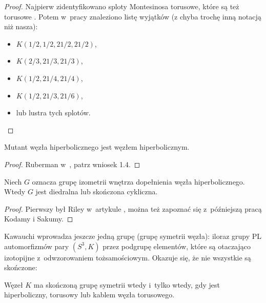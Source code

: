 \begin{proof}
    Najpierw zidentyfikowano sploty Montesinosa torusowe, które są też torusowe \cite{boileau80}.
    Potem w~pracy \cite{oertel84} znaleziono listę wyjątków (z chyba trochę inną notacją niż nasza):
    \begin{itemize}
        \item $K(1/2, 1/2, 21/2, 21/2)$,
        \item $K(2/3, 21/3, 21/3)$,
        \item $K(1/2, 21/4, 21/4)$,
        \item $K(1/2, 21/3, 21/6)$,
        \item lub lustra tych splotów. \qedhere
    \end{itemize}
\end{proof}

\begin{proposition}
    Mutant węzła hiperbolicznego jest węzłem hiperbolicznym.
\end{proposition}

\begin{proof}
%
    Ruberman w~\cite{ruberman87}, patrz wniosek 1.4.
\end{proof}

\begin{proposition}
    Niech $G$ oznacza grupę izometrii wnętrza dopełnienia węzła hiperbolicznego.
    Wtedy $G$ jest diedralna lub skończona cykliczna.
\end{proposition}

\begin{proof}
%
%
%
    Pierwszy był Riley w~artykule \cite[s. 124]{riley79}, można też zapoznać się z~późniejszą pracą \cite{kodama92} Kodamy i Sakumy.
\end{proof}

Kawauchi \cite[s. 131]{kawauchi96} wprowadza jeszcze jedną grupę (grupę symetrii węzła): iloraz grupy PL automorfizmów pary $(S^3, K)$ przez podgrupę elementów, które są otaczająco izotopijne z~odwzorowaniem tożsamościowym.
Okazuje się, że nie wszystkie są skończone:

\begin{proposition}
    Węzeł $K$ ma skończoną grupę symetrii wtedy i~tylko wtedy, gdy jest hiperboliczny, torusowy lub kablem węzła torusowego.
\end{proposition}

